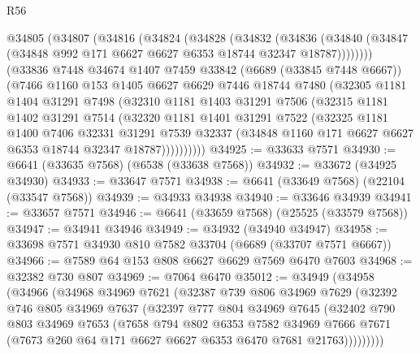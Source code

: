 \begin{lexlean}{R56}
\begin{coremodule}
    @34805
      (@34807
        (@34816
          (@34824
            (@34828
              (@34832
                (@34836
                  (@34840 (@34847 (@34848 @992 @171 @6627 @6627 @6353 @18744 @32347 @18787))))))))
        (@33836
          @7448
          @34674
          @1407
          @7459
          @33842
          (@6689 (@33845 @7448 @6667))
          (@7466
            @1160
            @153
            @1405
            @6627
            @6629
            @7446
            @18744
            @7480
            (@32305
              @1181
              @1404
              @31291
              @7498
              (@32310
                @1181
                @1403
                @31291
                @7506
                (@32315
                  @1181
                  @1402
                  @31291
                  @7514
                  (@32320
                    @1181
                    @1401
                    @31291
                    @7522
                    (@32325
                      @1181
                      @1400
                      @7406
                      @32331
                      @31291
                      @7539
                      @32337
                      (@34848 @1160 @171 @6627 @6627 @6353 @18744 @32347 @18787))))))))))
@34925 := @33633 @7571
@34930 := @6641 (@33635 @7568) (@6538 (@33638 @7568))
@34932 := @33672 (@34925 @34930)
@34933 := @33647 @7571
@34938 := @6641 (@33649 @7568) (@22104 (@33547 @7568))
@34939 := @34933 @34938
@34940 := @33646 @34939
@34941 := @33657 @7571
@34946 := @6641 (@33659 @7568) (@25525 (@33579 @7568))
@34947 := @34941 @34946
@34949 := @34932 (@34940 @34947)
@34958 := @33698 @7571 @34930 @810 @7582 @33704 (@6689 (@33707 @7571 @6667))
@34966 := @7589 @64 @153 @808 @6627 @6629 @7569 @6470 @7603
@34968 := @32382 @730 @807
@34969 := @7064 @6470
@35012 := @34949
    (@34958
      (@34966
        (@34968
          @34969
          @7621
          (@32387
            @739
            @806
            @34969
            @7629
            (@32392
              @746
              @805
              @34969
              @7637
              (@32397
                @777
                @804
                @34969
                @7645
                (@32402
                  @790
                  @803
                  @34969
                  @7653
                  (@7658
                    @794
                    @802
                    @6353
                    @7582
                    @34969
                    @7666
                    @7671
                    (@7673 @260 @64 @171 @6627 @6627 @6353 @6470 @7681 @21763)))))))))

\end{coremodule}
\end{lexlean}
